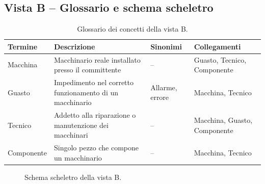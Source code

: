 \subsection{Vista B -- Glossario e schema scheletro}
\label{sec:an-B}

\begin{table}[H]
\centering\small
\begin{tabularx}{\textwidth}{@{}>{\raggedright\arraybackslash}p{2.0cm} Y >{\raggedright\arraybackslash}p{3.0cm} >{\raggedright\arraybackslash}p{5.2cm}@{}}
\toprule
\textbf{Termine} & \textbf{Descrizione} & \textbf{Sinonimi} & \textbf{Collegamenti} \\
\midrule
Macchina   & Macchinario reale installato presso il committente & -- & Guasto, Tecnico, Componente \\
Guasto     & Impedimento nel corretto funzionamento di un macchinario & Allarme, errore & Macchina, Tecnico \\
Tecnico    & Addetto alla riparazione o manutenzione dei macchinari & -- & Macchina, Guasto, Componente \\
Componente & Singolo pezzo che compone un macchinario & -- & Macchina, Tecnico \\
\bottomrule
\end{tabularx}
\caption{Glossario dei concetti della vista B.}
\label{tab:gloss-B}
\end{table}

\begin{figure}[H]
\centering
{}
\caption{Schema scheletro della vista B.}
\label{fig:sch-B}
\end{figure}
